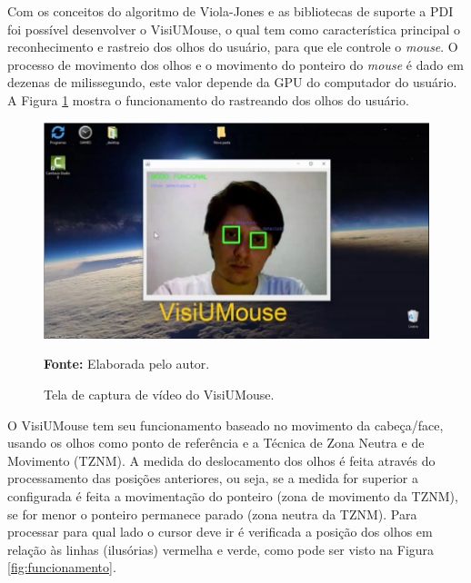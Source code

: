 Com os conceitos do algoritmo de Viola-Jones e as bibliotecas de suporte a PDI foi possível desenvolver o VisiUMouse, o qual tem como característica principal o reconhecimento e rastreio dos olhos do usuário, para  que ele controle o \textit{mouse}. O processo de movimento dos olhos e o movimento do ponteiro do \textit{mouse} é dado em dezenas de milissegundo, este valor depende da GPU do computador do usuário. A Figura \ref{fig:visiumouse-1} mostra o funcionamento do rastreando dos olhos do usuário.
\begin{figure}[H]
\centering
\caption{Tela de captura de vídeo do VisiUMouse.}
\includegraphics[scale=.4]{img/visiumouse-1.png}

 {\fontsize{11}{11}\selectfont \textbf{Fonte:} Elaborada pelo autor.}
\label{fig:visiumouse-1}
\end{figure}

O VisiUMouse tem seu funcionamento baseado no movimento da cabeça/face, usando os olhos como ponto de referência e a Técnica de Zona Neutra e de Movimento (TZNM). A medida do deslocamento dos olhos é feita através do processamento das posições anteriores, ou seja, se a medida for superior a configurada é feita a movimentação do ponteiro (zona de movimento da TZNM), se for menor o ponteiro permanece parado (zona neutra da TZNM). Para processar para qual lado o cursor deve ir é verificada a posição dos olhos em relação às linhas (ilusórias) vermelha e verde, como pode ser visto na Figura \ref{fig:funcionamento}.

